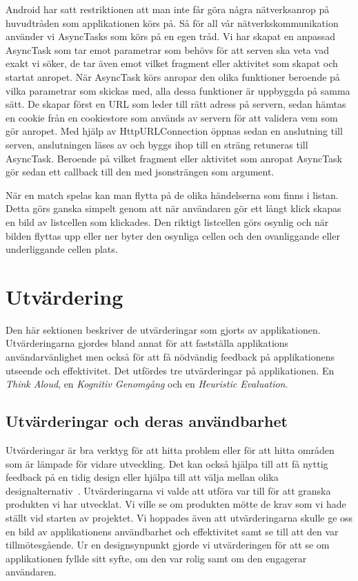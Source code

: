 \documentclass[a4paper, 11pt]{article}
\begin{document}
Android har satt restriktionen att man inte får göra några nätverksanrop på huvudtråden som applikationen körs på. Så för all vår nätverkskommunikation använder vi AsyncTasks som körs på en egen tråd. Vi har skapat en anpassad AsyncTask som tar emot parametrar som behövs för att serven ska veta vad exakt vi söker, de tar även emot vilket fragment eller aktivitet som skapat och startat anropet. När AsyncTask körs anropar den olika funktioner beroende på vilka parametrar som skickas med, alla dessa funktioner är uppbyggda på samma sätt. De skapar först en URL som leder till rätt adress på servern, sedan hämtas en cookie från en cookiestore som används av servern för att validera vem som gör anropet. Med hjälp av HttpURLConnection öppnas sedan en anslutning till serven, anslutningen läses av och byggs ihop till en sträng retuneras till AsyncTask. Beroende på vilket fragment eller aktivitet som anropat AsyncTask gör sedan ett callback till den med jsonsträngen som argument.


När en match spelas kan man flytta på de olika händelserna som finns i listan. Detta görs ganska simpelt genom att när användaren gör ett långt klick skapas en bild av listcellen som klickades. Den riktigt listcellen görs osynlig och när bilden flyttas upp eller ner byter den osynliga cellen och den ovanliggande eller underliggande cellen plats.




\section{Utvärdering}
Den här sektionen beskriver de utvärderingar som gjorts av applikationen. Utvärderingarna gjordes bland annat för att fastställa applikations användarvänlighet men också för att få nödvändig feedback på applikationens utseende och effektivitet. Det utfördes tre utvärderingar på applikationen. En \textit{Think Aloud}, en \textit{Kognitiv Genomgång} och en \textit{Heuristic Evaluation}. 

\subsection{Utvärderingar och deras användbarhet}
Utvärderingar är bra verktyg för att hitta problem eller för att hitta områden som är lämpade för vidare utveckling. Det kan också hjälpa till att få nyttig feedback på en tidig design eller hjälpa till att välja mellan olika designalternativ~\cite[sid 226--228]{benyon2010designing}. Utvärderingarna vi valde att utföra var till för att granska produkten vi har utvecklat. Vi ville se om produkten mötte de krav som vi hade ställt vid starten av projektet. Vi hoppades även att utvärderingarna skulle ge oss en bild av applikationens användbarhet och effektivitet samt se till att den var tillmötesgående. Ur en designsynpunkt gjorde vi utvärderingen för att se om applikationen fyllde sitt syfte, om den var rolig samt om den engagerar användaren.
\end{document}
